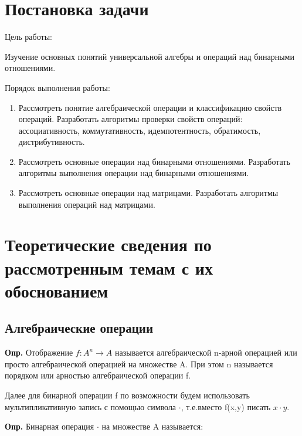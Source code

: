 \documentclass[spec, och, labwork]{shiza}
\begin{document}
\tableofcontents

\section{Постановка задачи}

Цель работы:

Изучение основных понятий универсальной алгебры и операций над бинарными отношениями. 

Порядок выполнения работы:
    \begin{enumerate}
        \item Рассмотреть понятие алгебраической операции и классификацию свойств операций. Разработать алгоритмы 
        проверки свойств операций: ассоциативность, коммутативность, идемпотентность, обратимость, дистрибутивность.
        \item Рассмотреть основные операции над бинарными отношениями. Разработать алгоритмы выполнения операции над
        бинарными отношениями.
        \item Рассмотреть основные операции над матрицами. Разработать алгоритмы выполнения операций над матрицами.
    \end{enumerate}

\section{Теоретические сведения по рассмотренным темам с их обоснованием}

    \subsection{Алгебраические операции}

    \textbf{Опр.} Отображение $f : A^n \rightarrow A$ называется алгебраической n-арной операцией или просто 
    алгебраической операцией на множестве A. При этом n называется порядком или арностью алгебраической операции f.

    Далее для бинарной операции f по возможности будем использовать мультипликативную запись с помощью символа $\cdot$,
    т.е.вместо f(x,y) писать $x \cdot y$.

    \textbf{Опр.} Бинарная операция $\cdot$ на множестве A называется:
\end{document}
